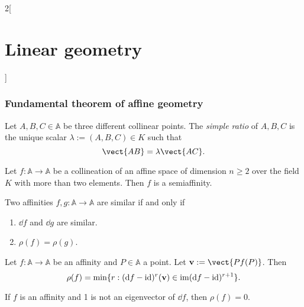 \documentclass[../../../main.tex]{subfiles}
\begin{document}
\begin{multicols}{2}[\section{Linear geometry}]
  \subsubsection{Fundamental theorem of affine geometry}
  \begin{definition}
    Let $A,B,C\in\mathbb{A}$ be three different collinear points. The \emph{simple ratio} of $A,B,C$ is the unique scalar $\lambda:=(A,B,C)\in K$ such that $$\vect{AB}=\lambda\vect{AC}.$$
    \begin{theorem}
      Let $f:\mathbb{A}\rightarrow\mathbb{A}$ be a collineation of an affine space of dimension $n\geq 2$ over the field $K$ with more than two elements. Then $f$ is a semiaffinity.
    \end{theorem}
    \begin{proposition}
      Two affinities $f,g:\mathbb{A}\rightarrow\mathbb{A}$ are similar if and only if
      \begin{enumerate}
        \item $\dd{f}$ and $\dd{g}$ are similar.
        \item $\rho(f)=\rho(g)$.
      \end{enumerate}
    \end{proposition}
    \begin{theorem}
      Let $f:\mathbb{A}\rightarrow\mathbb{A}$ be an affinity and $P\in\mathbb{A}$ a point. Let $\vf{v}:=\vect{Pf(P)}$. Then $$\rho(f)=\min\{r:(\dd{f}-\mathrm{id})^r(\boldsymbol{\mathrm{v}})\in\operatorname{im}(\dd{f}-\mathrm{id})^{r+1}\}.$$
    \end{theorem}
    \begin{corollary}
      If $f$ is an affinity and 1 is not an eigenvector of $\dd{f}$, then $\rho(f)=0$.
    \end{corollary}
  \end{definition}

\end{multicols}
\end{document}
